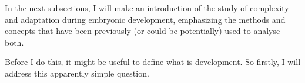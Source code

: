 %
In the next subsections, I will make an introduction of the study of complexity and adaptation during embryonic development, emphasizing the methods and concepts that have been previously (or could be potentially) used to analyse both. 

Before I do this, it might be useful to define what is development. So firstly, I will address this apparently simple question.
